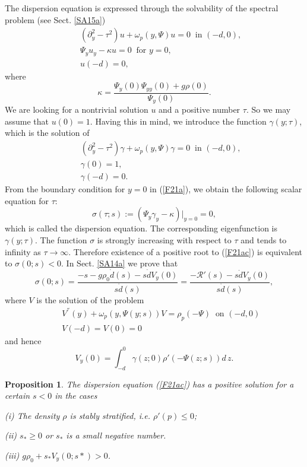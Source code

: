 \documentclass[a4paper,reqno,12pt]{amsart}
\theoremstyle{plain}
\newtheorem{proposition}[theorem]{Proposition}
\theoremstyle{definition}
\numberwithin{equation}{section}
\begin{document}
The dispersion equation is expressed through the solvability of the spectral problem (see Sect. \ref{SA15a})
\begin{eqnarray}\label{F21a}
&&(\partial_y^2-\tau^2)u+\omega_p(y,\Psi)u=0
\;\;\mbox{in $(-d,0)$},\nonumber\\
&&\Psi_yu_y-\kappa u=0\;\;\mbox{for $y=0$},\nonumber\\
&& u(-d)=0,
\end{eqnarray}
where
\begin{equation}\label{F21aa}
\kappa=\frac{\Psi_y(0)\Psi_{yy}(0)+g\rho(0)}{\Psi_y(0)}.
\end{equation}
We are looking for a nontrivial solution $u$ and a positive number $\tau$. So we may assume that $u(0)=1$. Having this in mind, we introduce the function $\gamma(y;\tau)$, which is the solution of
\begin{eqnarray}\label{F21ab}
&&(\partial_y^2-\tau^2)\gamma+\omega_p(y,\Psi)\gamma=0\;\;\mbox{in $(-d,0)$},\nonumber\\
&&\gamma(0)=1,\nonumber\\
&& \gamma(-d)=0.
\end{eqnarray}
From the boundary condition for $y=0$ in (\ref{F21a}), we obtain the following scalar  equation for $\tau$:
\begin{equation}\label{F21ac}
\sigma(\tau;s):=(\Psi_y\gamma_y-\kappa )|_{y=0}=0,
\end{equation}
which is called the dispersion equation.
The corresponding eigenfunction is $\gamma(y;\tau)$. The function $\sigma$ is strongly increasing with respect to $\tau$ and tends to infinity as $\tau\to \infty$. Therefore existence of a positive root to (\ref{F21ac}) is equivalent to
$\sigma(0;s)<0$. In Sect. \ref{SA14a} we prove that
\begin{equation}\label{F13ab}
\sigma(0;s)=\frac{-s-g\rho_0\dot{d}(s)-s\dot{d}V_y(0)}{s\dot{d}(s)}=
\frac{-{\mathcal R}'(s)-s\dot{d}V_y(0)}{s\dot{d}(s)},
\end{equation}
where $V$ is the solution of the problem
\begin{eqnarray}\label{F13a}
&&V^{''}(y)+\omega_p(y,\Psi(y;s))V=\rho_p(-\Psi)\;\;\mbox{on $(-d,0)$}\nonumber\\
&&V(-d)=V(0)=0
\end{eqnarray}
and hence
\begin{equation}\label{A18a}
V_y(0)=\int_{-d}^0\gamma(z;0)\rho'(-\Psi(z;s))d\,z.
\end{equation}
\begin{proposition}
The dispersion equation (\ref{F21ac}) has a positive solution for a certain $s<0$ in the cases

(i) The density  $\rho$ is stably stratified, i.e. $\rho'(p)\leq 0$;

(ii) $s_*\geq 0$ or $s_*$ is a small negative number.

(iii) $g\rho_0+s_*V_y(0;s*)>0$.
\end{proposition}
\end{document}
